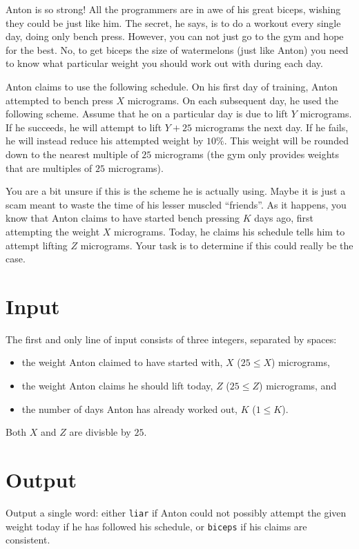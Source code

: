 Anton is so strong!
All the programmers are in awe of his great biceps, wishing they could be just like him.
The secret, he says, is to do a workout every single day, doing only bench press.
However, you can not just go to the gym and hope for the best.
No, to get biceps the size of watermelons (just like Anton) you need to know what particular weight you should work out with during each day.

Anton claims to use the following schedule.
On his first day of training, Anton attempted to bench press $X$ micrograms.
On each subsequent day, he used the following scheme.
Assume that he on a particular day is due to lift $Y$ micrograms.
If he succeeds, he will attempt to lift $Y + 25$ micrograms the next day.
If he fails, he will instead reduce his attempted weight by $10\%$.
This weight will be rounded down to the nearest multiple of $25$ micrograms (the gym only provides weights that are multiples of $25$ micrograms).

You are a bit unsure if this is the scheme he is actually using.
Maybe it is just a scam meant to waste the time of his lesser muscled ``friends''.
As it happens, you know that Anton claims to have started bench pressing $K$ days ago, first attempting the weight $X$ micrograms.
Today, he claims his schedule tells him to attempt lifting $Z$ micrograms.
Your task is to determine if this could really be the case.

\section*{Input}
The first and only line of input consists of three integers, separated by spaces:
\begin{itemize}
  \item the weight Anton claimed to have started with, $X$ ($25 \le X$) micrograms,
  \item the weight Anton claims he should lift today, $Z$ ($25 \le Z$) micrograms, and
  \item the number of days Anton has already worked out, $K$ ($1 \le K$).
\end{itemize}

Both $X$ and $Z$ are divisble by $25$.

\section*{Output}
Output a single word: either \texttt{liar} if Anton could not possibly attempt the given weight today if he has followed his schedule, or \texttt{biceps} if his claims are consistent.

